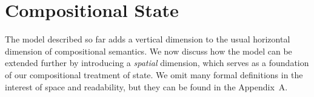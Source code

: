 \documentclass[acmsmall,screen,review,anonymous,nonacm]{acmart}
\newcommand{\kw}[1]{\ensuremath{ \mathsf{#1} }}
\newcommand{\que}{\circ}
\newcommand{\ans}{\bullet}
\begin{document}
%
%
%
%
%


\section{Compositional State} \label{sec:scomp} %


The model described so far adds a vertical dimension
to the usual horizontal dimension of compositional semantics.
We now discuss how the model can be extended further
by introducing a \emph{spatial} dimension,
which serves as a foundation of our compositional treatment of state.
We omit many formal definitions
in the interest of space and readability,
but they can be found in the Appendix~A.
\end{document}
